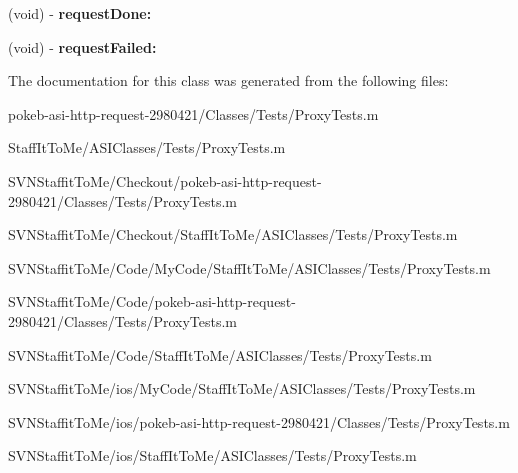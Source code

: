 \begin{DoxyCompactItemize}
\item 
\hypertarget{interface_proxy_tests_07_08_af754998401726574506376807a512a11}{
(void) -\/ {\bfseries request\-Done\-:}}
\label{interface_proxy_tests_07_08_af754998401726574506376807a512a11}

\item 
\hypertarget{interface_proxy_tests_07_08_a0d105115a121611f0b0fa697a0841a67}{
(void) -\/ {\bfseries request\-Failed\-:}}
\label{interface_proxy_tests_07_08_a0d105115a121611f0b0fa697a0841a67}

\end{DoxyCompactItemize}


\-The documentation for this class was generated from the following files\-:\begin{DoxyCompactItemize}
\item 
pokeb-\/asi-\/http-\/request-\/2980421/\-Classes/\-Tests/\-Proxy\-Tests.\-m\item 
\-Staff\-It\-To\-Me/\-A\-S\-I\-Classes/\-Tests/\-Proxy\-Tests.\-m\item 
\-S\-V\-N\-Staffit\-To\-Me/\-Checkout/pokeb-\/asi-\/http-\/request-\/2980421/\-Classes/\-Tests/\-Proxy\-Tests.\-m\item 
\-S\-V\-N\-Staffit\-To\-Me/\-Checkout/\-Staff\-It\-To\-Me/\-A\-S\-I\-Classes/\-Tests/\-Proxy\-Tests.\-m\item 
\-S\-V\-N\-Staffit\-To\-Me/\-Code/\-My\-Code/\-Staff\-It\-To\-Me/\-A\-S\-I\-Classes/\-Tests/\-Proxy\-Tests.\-m\item 
\-S\-V\-N\-Staffit\-To\-Me/\-Code/pokeb-\/asi-\/http-\/request-\/2980421/\-Classes/\-Tests/\-Proxy\-Tests.\-m\item 
\-S\-V\-N\-Staffit\-To\-Me/\-Code/\-Staff\-It\-To\-Me/\-A\-S\-I\-Classes/\-Tests/\-Proxy\-Tests.\-m\item 
\-S\-V\-N\-Staffit\-To\-Me/ios/\-My\-Code/\-Staff\-It\-To\-Me/\-A\-S\-I\-Classes/\-Tests/\-Proxy\-Tests.\-m\item 
\-S\-V\-N\-Staffit\-To\-Me/ios/pokeb-\/asi-\/http-\/request-\/2980421/\-Classes/\-Tests/\-Proxy\-Tests.\-m\item 
\-S\-V\-N\-Staffit\-To\-Me/ios/\-Staff\-It\-To\-Me/\-A\-S\-I\-Classes/\-Tests/\-Proxy\-Tests.\-m\end{DoxyCompactItemize}
